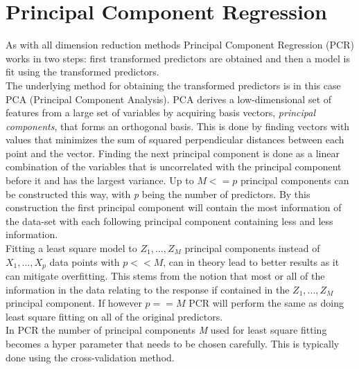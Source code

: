 \section{Principal Component Regression}
As with all dimension reduction methods Principal Component Regression (PCR) works in two steps: first transformed predictors are obtained and then a model is fit using the transformed predictors.\\
The underlying method for obtaining the transformed predictors is in this case PCA (Principal Component Analysis).
PCA derives a low-dimensional set of features from a large set of variables by acquiring basis vectors, \emph{principal components}, that forms an orthogonal basis. This is done by finding vectors with values that minimizes the sum of squared perpendicular distances between each point and the vector. Finding the next principal component is done as a linear combination of the variables that is uncorrelated with the principal component before it and has the largest variance. Up to \(M <= p\) principal components can be constructed this way, with \emph{p} being the number of predictors. By this construction the first principal component will contain the most information of the data-set with each following principal component containing less and less information.\\
Fitting a least square model to \(Z_1,...,Z_M\) principal components instead of \(X_1,...,X_p\) data points with \(p << M\), can in theory lead to better results as it can mitigate overfitting. This stems from the notion that most or all of the information in the data relating to the response if contained in the \(Z_1,...,Z_M\) principal component. If however \(p == M\) PCR will perform the same as doing least square fitting on all of the original predictors.\\
In PCR the number of principal components \emph{M} used for least square fitting becomes a hyper parameter that needs to be chosen carefully. This is typically done using the cross-validation method.


